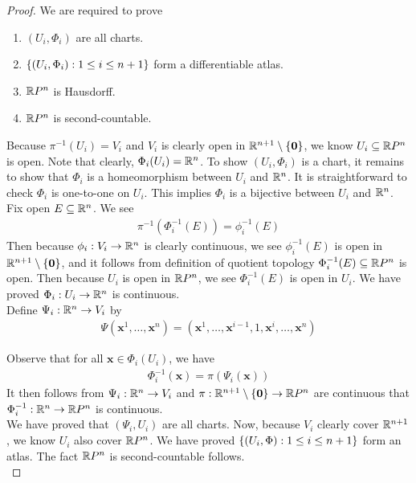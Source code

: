 \documentclass{report}
\begin{document}
\begin{proof}
We are required to prove 
\begin{enumerate}[label=(\alph*)] 
  \item $(U_i,\Phi_i)$ are all charts. 
  \item $\{ (U_i,\Phi_i):1\leq i\leq n+1 \}$ form a differentiable atlas. 
\item $\mathbb{R} P^n$ is Hausdorff.
\item $\mathbb{R} P^n$ is second-countable. 
\end{enumerate}
 Because $\pi^{-1}(U_i)=V_i$ and $V_i$ is clearly open in $\mathbb{R}^{n+1}\setminus \{ \textbf{0} \}$, we know $U_i\subseteq \mathbb{R} P^n$ is open. Note that clearly,   $\Phi_i(U_i)=\mathbb{R}^n$. To show $(U_i,\Phi_i)$ is a chart, it remains to show that $\Phi_i$ is a homeomorphism between $U_i$ and  $\mathbb{R}^n$.  It is straightforward to check $\Phi_i$ is one-to-one on $U_i$. This implies $\Phi_i$ is a bijective between $U_i$ and  $\mathbb{R}^n$. \\


Fix open $E\subseteq \mathbb{R}^n$. We see 
\begin{align*}
  \pi^{-1}(\Phi_i^{-1}(E))=\phi_i^{-1}(E)
\end{align*}
Then because $\phi_i:V_i\rightarrow \mathbb{R}^n$ is clearly continuous, we see $\phi_i^{-1}(E)$ is open in $\mathbb{R}^{n+1}\setminus \{ \textbf{0} \}$, and it follows from definition of quotient topology  $\Phi_i^{-1}(E)\subseteq \mathbb{R} P^n$ is open. Then because $U_i$ is open in  $\mathbb{R} P^n$, we see $\Phi_i^{-1}(E)$ is open in $U_i$. We have proved  $\Phi_i:U_i\rightarrow \mathbb{R}^n$ is continuous.\\


Define $\Psi_i: \mathbb{R}^n\rightarrow V_i$ by 
\begin{align*}
\Psi (\textbf{x}^1,\dots ,\textbf{x}^n)= (\textbf{x}^1,\dots ,\textbf{x}^{i-1},1,\textbf{x}^i,\dots ,\textbf{x}^n)
\end{align*}



Observe that for all $\textbf{x}\in \Phi_i(U_i)$, we have
\begin{align*}
\Phi_i^{-1}(\textbf{x})= \pi(\Psi_i (\textbf{x}))
\end{align*}
It then follows from $\Psi_i:\mathbb{R}^n\rightarrow V_i$ and $\pi:\mathbb{R}^{n+1}\setminus \{ \textbf{0} \}\rightarrow \mathbb{R} P^n$ are continuous that $\Phi_i^{-1}:\mathbb{R}^n\rightarrow \mathbb{R} P^n$ is continuous.\\

We have proved that $(\Psi_i,U_i)$ are all charts. Now, because $V_i$ clearly cover $\mathbb{R}^{n+1}$, we know $U_i$ also cover  $\mathbb{R} P^n$. We have proved $\{ (U_i,\Phi):1\leq i\leq n+1 \}$ form an atlas. The fact $\mathbb{R} P^n$ is second-countable follows. \\


\end{proof}
\end{document}
